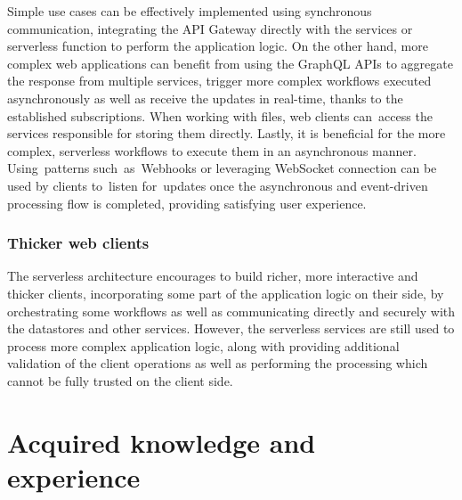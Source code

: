 Simple use cases can be effectively implemented using synchronous communication, integrating the API Gateway directly with the services or serverless function to perform the application logic.
On the other hand, more complex web applications can benefit from using the GraphQL APIs to aggregate the response from multiple services, trigger more complex workflows executed asynchronously as well as receive the updates in real-time, thanks to the established subscriptions.
When working with files, web clients can~access the services responsible for storing them directly.
Lastly, it is beneficial for the more complex, serverless workflows to execute them in an asynchronous manner.
Using~patterns such~as~Webhooks or leveraging WebSocket connection can be used by clients to~listen for~updates once the asynchronous and event-driven processing flow is completed, providing satisfying user experience.



\subsubsection{Thicker web clients}

The serverless architecture encourages to build richer, more interactive and thicker clients, incorporating some part of the application logic on their side, by orchestrating some workflows as well as communicating directly and securely with the datastores and other services.
However, the serverless services are still used to process more complex application logic, along with providing additional validation of the client operations as well as performing the processing which cannot be fully trusted on the client side.

\section{Acquired knowledge and experience}

